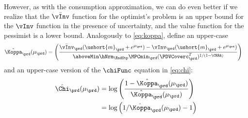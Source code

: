   However, as with the consumption approximation, we can do even better if we
  realize that the $\bar{\vInv}$ function for the optimist's problem is
  an upper bound for the ${\vInv}$ function in the presence of uncertainty, and the value function
  for the pessimist is a lower bound. Analogously to \eqref{eq:koppa}, define an upper-case
  \begin{equation}\begin{gathered}\begin{aligned}
        \hat{\Koppa}_{\prd}(\mu_{\prd})   & = \left(\frac{\bar{\vInv}_{\prd}(\ushort{m}_{\prd}+e^{\mu_{\prd}})-\vInv_{\prd}(\ushort{m}_{\prd}+e^{\mu_{\prd}})}{\aboveMin \hNrm_{\EndStp} \MPCmin_{\prd} (\PDVCoverc_{\prd}^{T})^{1/(1-\CRRA)}}\right) \label{eq:Koppa}
      \end{aligned}\end{gathered}\end{equation}
  and an upper-case version of the $\chiFunc$ equation in \eqref{eq:chi}:
  \begin{equation}\begin{gathered}\begin{aligned}
        \hat{\Chi}_{\prd}(\mu_{\prd})  & = \log \left(\frac{1-\hat{\Koppa}_{\prd}(\mu_{\prd})}{\hat{\Koppa}_{\prd}(\mu_{\prd})}\right)
        \\  & = \log \left(1/\hat{\Koppa}_{\prd}(\mu_{\prd})-1\right) \label{eq:Chi}
      \end{aligned}\end{gathered}\end{equation}
